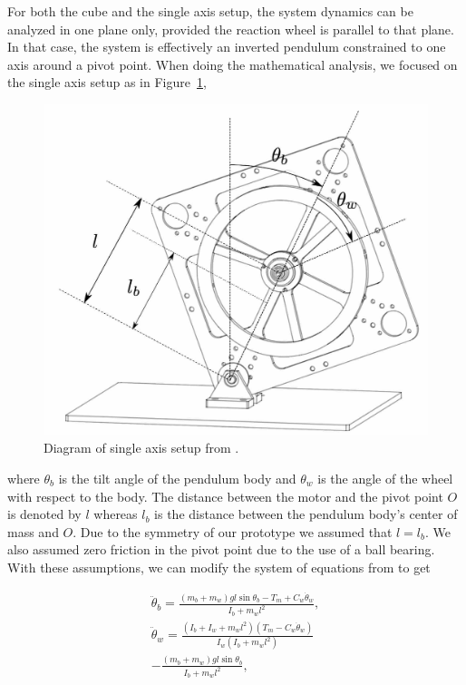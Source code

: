 For both the cube and the single axis setup, the system dynamics can be analyzed in one plane only, provided the reaction wheel is parallel to that plane. In that case, the system is effectively an inverted pendulum constrained to one axis around a pivot point. When doing the mathematical analysis, we focused on the single axis setup as in Figure~\ref{fig:cubli_planar_diagram},

\begin{figure}[H]
    \centering
    \includegraphics[width=.8\linewidth]{figures/Planar-diagram.jpg}
    \caption{Diagram of single axis setup from \cite{cubli-planar}.}
    \label{fig:cubli_planar_diagram}
\end{figure}

\noindent
where $\theta_b$ is the tilt angle of the pendulum body and $\theta_w$ is the angle of the wheel with respect to the body. The distance between the motor and the pivot point $O$ is denoted by $l$ whereas $l_b$ is the distance between the pendulum body's center of mass and $O$. Due to the symmetry of our prototype we assumed that $l = l_b$. We also assumed zero friction in the pivot point due to the use of a ball bearing. With these assumptions, we can modify the system of equations from \cite{cubli-planar} to get

\begin{equation}\label{eq:system}
    \begin{gathered}
        \ddot\theta_b = \frac{(m_b + m_w)gl\sin\theta_b - T_m +C_w\dot\theta_w}{I_b + m_wl^2}, \\
        \ddot\theta_w = \frac{(I_b + I_w + m_wl^2) \left( T_m - C_w\dot\theta_w \right)}{I_w(I_b + m_wl^2)} \\- \frac{(m_b + m_w)gl\sin\theta_b}{I_b + m_wl^2},
    \end{gathered}
\end{equation}

